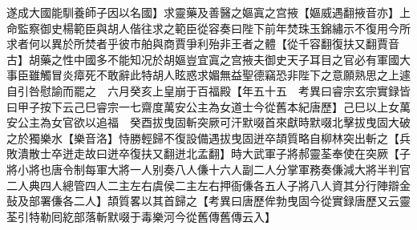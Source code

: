 遂成大國能馴養師子因以名國】求靈藥及善醫之嫗寘之宫掖【嫗威遇翻掖音亦】上命監察御史楊範臣與胡人偕往求之範臣從容奏曰陛下前年焚珠玉錦繡示不復用今所求者何以異於所焚者乎彼市舶與商賈爭利殆非王者之體【從千容翻復扶又翻賈音古】胡藥之性中國多不能知况於胡嫗豈宜寘之宫掖夫御史天子耳目之官必有軍國大事臣雖觸冒炎瘴死不敢辭此特胡人眩惑求媚無益聖德竊恐非陛下之意願熟思之上遽自引咎慰諭而罷之　六月癸亥上皇崩于百福殿【年五十五　考異曰睿宗玄宗實録皆曰甲子按下云己巳睿宗一七齋度萬安公主為女道士今從舊本紀唐歷】己巳以上女萬安公主為女官欲以追福　癸酉拔曳固斬突厥可汗默啜首來獻時默啜北擊拔曳固大破之於獨樂水【樂音洛】恃勝輕歸不復設備遇拔曳固迸卒頡質略自柳林突出斬之【兵敗潰散士卒迸走故曰迸卒復扶又翻迸北孟翻】時大武軍子將郝靈荃奉使在突厥【子將小將也唐令制每軍大將一人别奏八人傔十六人副二人分掌軍務奏傔減大將半判官二人典四人總管四人二主左右虞侯二主左右押衙傔各五人子將八人資其分行陣辯金鼔及部署傔各二人】頡質畧以其首歸之【考異曰唐歷侔勃曳固今從實録唐歷又云靈荃引特勒囘紇部落斬默啜于毒樂河今從舊傳舊傳云入】

